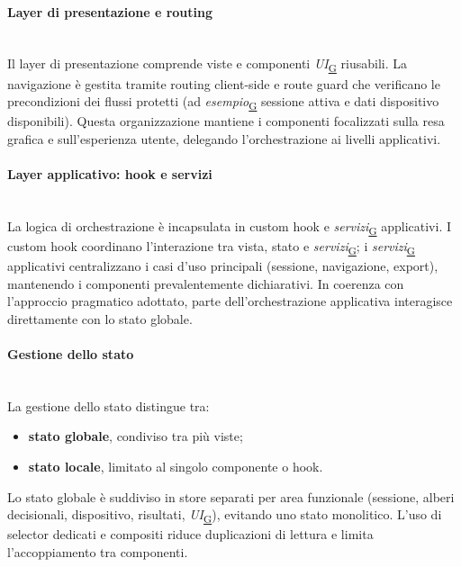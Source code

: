 \documentclass[a4paper,12pt]{article}
\begin{document}
            \paragraph{Layer di presentazione e routing}\mbox{}\\
            Il layer di presentazione comprende viste e componenti \textit{UI}\textsubscript{\href{https://atlasteam9.github.io/Atlas/glossario.html\#UI}{G}} riusabili. La navigazione è gestita tramite routing client-side e route guard che verificano le precondizioni dei flussi protetti (ad \textit{esempio}\textsubscript{\href{https://atlasteam9.github.io/Atlas/glossario.html\#Esempio}{G}} sessione attiva e dati dispositivo disponibili).  
            Questa organizzazione mantiene i componenti focalizzati sulla resa grafica e sull'esperienza utente, delegando l'orchestrazione ai livelli applicativi.

            \paragraph{Layer applicativo: hook e servizi}\mbox{}\\
            La logica di orchestrazione è incapsulata in custom hook e \textit{servizi}\textsubscript{\href{https://atlasteam9.github.io/Atlas/glossario.html\#Servizi}{G}} applicativi.  
            I custom hook coordinano l'interazione tra vista, stato e \textit{servizi}\textsubscript{\href{https://atlasteam9.github.io/Atlas/glossario.html\#Servizi}{G}}; i \textit{servizi}\textsubscript{\href{https://atlasteam9.github.io/Atlas/glossario.html\#Servizi}{G}} applicativi centralizzano i casi d'uso principali (sessione, navigazione, export), mantenendo i componenti prevalentemente dichiarativi.  
            In coerenza con l'approccio pragmatico adottato, parte dell'orchestrazione applicativa interagisce direttamente con lo stato globale.
            
            \paragraph{Gestione dello stato}\mbox{}\\
            La gestione dello stato distingue tra:
            \begin{itemize}
                \item \textbf{stato globale}, condiviso tra più viste;
                \item \textbf{stato locale}, limitato al singolo componente o hook.
            \end{itemize}
            Lo stato globale è suddiviso in store separati per area funzionale (sessione, alberi decisionali, dispositivo, risultati, \textit{UI}\textsubscript{\href{https://atlasteam9.github.io/Atlas/glossario.html\#UI}{G}}), evitando uno stato monolitico.  
            L'uso di selector dedicati e compositi riduce duplicazioni di lettura e limita l'accoppiamento tra componenti.
            
\end{document}
